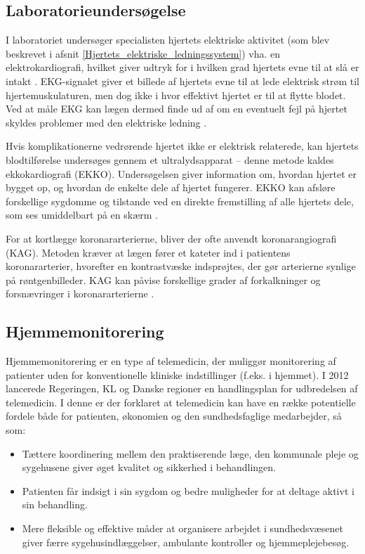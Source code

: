 \subsection{Laboratorieundersøgelse}
I laboratoriet undersøger specialisten hjertets elektriske aktivitet (som blev beskrevet i afsnit \ref{Hjertets_elektriske_ledningssystem}) vha. en elektrokardiografi, hvilket giver udtryk for i hvilken grad hjertets evne til at slå er intakt \cite{ekg}. EKG-signalet giver et billede af hjertets evne til at lede elektrisk strøm til hjertemuskulaturen, men dog ikke i hvor effektivt hjertet er til at flytte blodet. Ved at måle EKG kan lægen dermed finde ud af om en eventuelt fejl på hjertet skyldes problemer med den elektriske ledning \cite{ekg}.
 
Hvis komplikationerne vedrørende hjertet ikke er elektrisk relaterede, kan hjertets blodtilførelse undersøges gennem et ultralydsapparat – denne metode kaldes ekkokardiografi (EKKO). Undersøgelsen giver information om, hvordan hjertet er bygget op, og hvordan de enkelte dele af hjertet fungerer. EKKO kan afsløre forskellige sygdomme og tilstande ved en direkte fremstilling af alle hjertets dele, som ses umiddelbart på en skærm \cite{hjerud}.
 
For at kortlægge koronararterierne, bliver der ofte anvendt koronarangiografi (KAG). Metoden kræver at lægen fører et kateter ind i patientens koronararterier, hvorefter en kontrastvæske indsprøjtes, der gør arterierne synlige på røntgenbilleder. KAG kan påvise forskellige grader af forkalkninger og forsnævringer i koronararterierne \cite{hjerud}. 
 
\subsection{Hjemmemonitorering}
Hjemmemonitorering er en type af telemedicin, der muliggør monitorering af patienter uden for konventionelle kliniske indstillinger (f.eks. i hjemmet). I 2012 lancerede Regeringen, KL og Danske regioner en handlingsplan for udbredelsen af telemedicin. I denne er der forklaret at telemedicin kan have en række potentielle fordele både for patienten, økonomien og den sundhedsfaglige medarbejder, så som:
\begin{itemize}
\item Tættere koordinering mellem den praktiserende læge, den kommunale pleje og sygehusene giver øget kvalitet og sikkerhed i behandlingen.
\item Patienten får indsigt i sin sygdom og bedre muligheder for at deltage aktivt i sin behandling.
\item Mere fleksible og effektive måder at organisere arbejdet i sundhedsvæsenet giver færre sygehusindlæggelser, ambulante kontroller og hjemmeplejebesøg.
\end{itemize}
 

